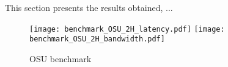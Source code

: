 
This section presents the results obtained, ...


\begin{figure}[h]
    \centering
    \texttt{[image: benchmark\_OSU\_2H\_latency.pdf]}
    \texttt{[image: benchmark\_OSU\_2H\_bandwidth.pdf]}
    \caption{OSU benchmark}
    \label{fig:osu}
\end{figure}


% 
